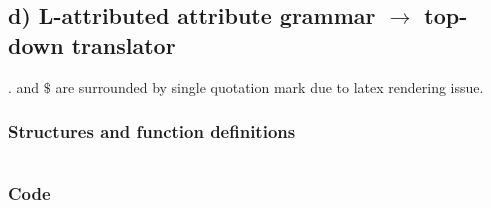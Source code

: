 \documentclass[12pt, A4]{article}
\begin{document}
    \newpage
    \subsection*{d) L-attributed attribute grammar $\rightarrow$ top-down translator}
    
    $.$ and $\$$ are surrounded by single quotation mark due to latex rendering issue.\\
    
    \subsubsection*{Structures and function definitions}
    \inputminted{c++}{QuestionD/node.cpp}
    
    \newpage
    \subsubsection*{Code}
    \inputminted{c++}{QuestionD/S.cpp}
    
    \newpage
    \inputminted{c++}{QuestionD/R.cpp}
    
    \newpage
    \inputminted{c++}{QuestionD/L.cpp}
    
    \newpage
    \inputminted{c++}{QuestionD/Ls.cpp}
    
    \newpage
    \inputminted{c++}{QuestionD/B.cpp}
	
\end{document}
